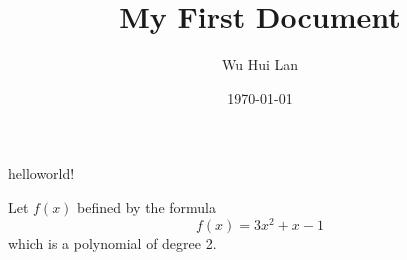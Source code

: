 \documentclass{article} %
\title{My First Document}
\author{Wu Hui Lan}
\date{\today}
\begin{document}

	\maketitle
	
	helloworld!
	
	Let $f(x)$ befined by the formula
	$$f(x)=3x^2+x-1$$which is a polynomial of degree 2.
\end{document}
